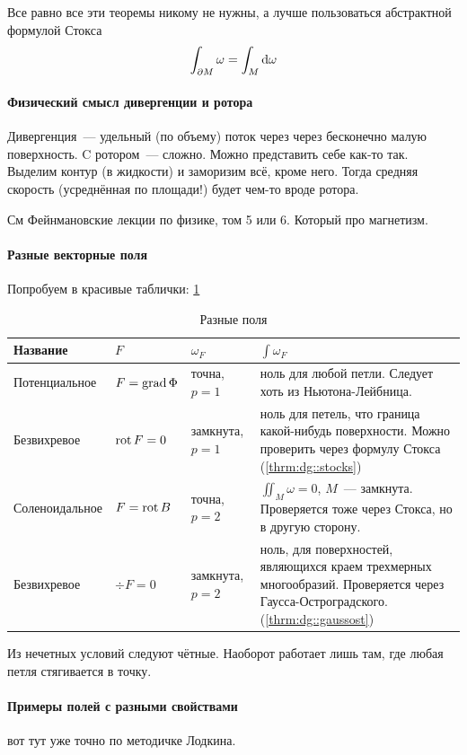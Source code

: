 \documentclass[draft,timbord]{longnotes}
\begin{document}
Все равно все эти теоремы никому не нужны, а лучше пользоваться абстрактной формулой Стокса
\[
  \int_{\partial M} \omega  = \int_M \mathrm{d} \omega 
\]

\paragraph{Физический смысл дивергенции и ротора}
\label{par:dg::physdiv}

Дивергенция~--- удельный (по объему) поток через через бесконечно малую поверхность.
C ротором~--- сложно. Можно представить себе как-то так. Выделим контур (в жидкости)
и заморизим всё, кроме него. Тогда средняя скорость (усреднённая по площади!) будет
чем-то вроде ротора.

См Фейнмановские лекции по физике, том 5 или 6. Который про магнетизм.

\paragraph{Разные векторные поля}
\label{par:dg::vecftypes}

Попробуем в красивые таблички: \ref{tab:dg::vecftypes::prop}

\vspace{1em}

\begin{table}[h]
  \def\arraystretch{1.7}
  \caption{Разные поля}
  \vspace{0.5em}
  \label{tab:dg::vecftypes::prop}
  \begin{tabularx}{0.8\linewidth}{l l l X} \toprule
    \bf Название  & $F$            & $\omega_F$ & $\int \omega_F$  \\ \midrule
    Потенциальное & $F=\operatorname{grad} \Phi$ & точна, $p=1$ & ноль для любой петли. 
    Следует хоть из Ньютона-Лейбница.\\
    
    Безвихревое   & $\operatorname{rot} F = 0$ & замкнута, $p=1$  &
    ноль для петель, что граница какой-нибудь поверхности. 
    Можно проверить через формулу Стокса (\ref{thrm:dg::stocks}) \\
    
    Соленоидальное & $F = \operatorname{rot} B$ & точна, $p=2$ &
    $\displaystyle\iint_{M} \omega = 0$, $M$~--- замкнута.
    Проверяется тоже через Стокса, но в другую сторону.\\

    Безвихревое & $\div F = 0$ & замкнута, $p=2$ & ноль, для поверхностей, 
    являющихся краем трехмерных многообразий. Проверяется через Гаусса-Остроградского.
    (\ref{thrm:dg::gaussost})
    
    \\ \bottomrule
  \end{tabularx}
\end{table}

Из нечетных условий следуют чётные.
Наоборот работает лишь там, где любая петля стягивается в точку.


\paragraph{Примеры полей с разными свойствами}
\label{par:dg::vecfitwo}

вот тут уже точно по методичке Лодкина.
\end{document}
